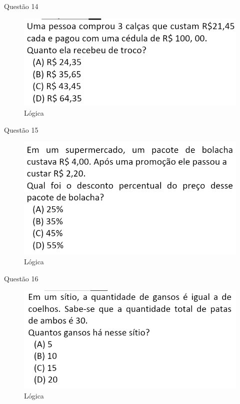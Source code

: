 \documentclass{beamer}
\begin{document}
\begin{frame}{Questão 14}
    \begin{figure}
        \caption{Lógica}
        \includegraphics[scale=0.8]{qst24.16.png}
    \end{figure}
\end{frame}
\begin{frame}{Questão 15}
    \begin{figure}
        \caption{Lógica}
        \includegraphics[scale=0.8]{qst24.38.png}
    \end{figure}
\end{frame}
\begin{frame}{Questão 16}
    \begin{figure}
        \caption{Lógica}
        \includegraphics[scale=0.8]{qst25.41.png}
    \end{figure}
\end{frame}
\end{document}
